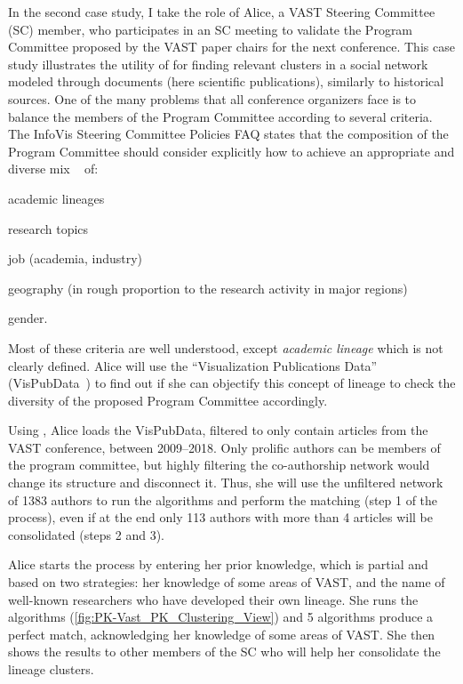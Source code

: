 In the second case study, I take the role of Alice, a VAST Steering Committee (SC) member, who participates in an SC meeting to validate the Program Committee proposed by the VAST paper chairs for the next conference.
This case study illustrates the utility of \pkclustering for finding relevant clusters in a social network modeled through documents (here scientific publications), similarly to historical sources.
One of the many problems that all conference organizers face is to balance the members of the Program Committee according to several criteria.
The InfoVis Steering Committee Policies FAQ states that the composition of the Program Committee should consider explicitly how to achieve an appropriate and diverse mix ~\cite{infovisfaq} of:
\begin{itemize*}
\item academic lineages
\item research topics
\item job (academia, industry)
\item geography (in rough proportion to the research activity in major regions)
\item gender.
\end{itemize*}
Most of these criteria are well understood, except \emph{academic lineage} which is not clearly defined.
Alice will use the ``Visualization Publications Data'' (VisPubData~\cite{VisPubData}) to find out if she can objectify this concept of lineage to check the diversity of the proposed Program Committee accordingly.

Using \pkclustering, Alice loads the VisPubData, filtered to only contain articles from the VAST conference, between 2009--2018. Only prolific authors can be members of the program committee, but highly filtering the co-authorship network  would change its structure and disconnect it. Thus, she will use the unfiltered network of 1383 authors to run the algorithms and perform the matching (step 1 of the process), even if at the end only 113 authors with more than 4 articles will be consolidated (steps 2 and 3).

Alice starts the \pkclustering process by entering her prior knowledge, which is partial and based on two strategies: her knowledge of some areas of VAST, and the name of well-known researchers who have developed their own lineage. She runs the algorithms (\autoref{fig:PK-Vast_PK_Clustering_View}) and 5 algorithms produce a perfect match, acknowledging her knowledge of some areas of VAST. She then shows the results to other members of the SC who will help her consolidate the lineage clusters.

